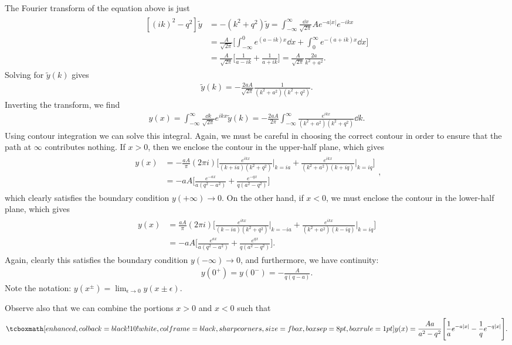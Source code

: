 The Fourier transform of the equation above is just
\begin{eqnarray}
\begin{aligned}
    [ (ik)^2- q^2 ] \tilde{y} &= -(k^2+q^2)\tilde{y} = \int_{-\infty}^{\infty} \frac{\dd{x}}{\sqrt{2\pi}} A e^{-a|x|}e^{-ikx} \\
    &= \frac{A}{\sqrt{2\pi}} \Bigg[ \int_{-\infty}^{0} e^{(a-ik)x} \dd{x} + \int_{0}^{\infty} e^{-(a+ik)x} \dd{x} \Bigg] \\
    &= \frac{A}{\sqrt{2\pi}} \Bigg[ \frac{1}{a-ik} + \frac{1}{a+ik} \Bigg] = \frac{A}{\sqrt{2\pi}} \frac{2a}{k^2+a^2}
.\end{aligned}
\end{eqnarray}
Solving for $\tilde{y}(k)$ gives
\begin{eqnarray}
    \tilde{y}(k) = -\frac{2aA}{\sqrt{2\pi}} \frac{1}{(k^2+a^2)(k^2+q^2)}
.\end{eqnarray}
Inverting the transform, we find
\begin{eqnarray}
    y(x) = \int_{-\infty}^{\infty} \frac{\dd{k}}{\sqrt{2\pi}} e^{ikx} \tilde{y}(k) = -\frac{2aA}{2\pi} \int_{-\infty}^{\infty} \frac{e^{ikx}}{(k^2+a^2)(k^2+q^2)} \dd{k}
.\end{eqnarray}
Using contour integration we can solve this integral.
Again, we must be careful in choosing the correct contour in order to ensure that the path at $\infty$ contributes nothing.
If $x > 0$, then we enclose the contour in the upper-half plane, which gives
\begin{eqnarray}
\begin{aligned}        
    y(x) &= -\frac{aA}{\pi} (2 \pi i) \Bigg[ \frac{e^{ikx}}{(k+ia)(k^2+q^2)}\Big|_{k=ia} + \frac{e^{ikx}}{(k^2+a^2)(k+iq)}\Big|_{k=iq} \Bigg] \\
    &= -aA \Bigg[ \frac{e^{-ax}}{a(q^2 - a^2)} + \frac{e^{-qx}}{q(a^2-q^2)} \Bigg]
\end{aligned}
,\end{eqnarray}
which clearly satisfies the boundary condition $y(+\infty) \rightarrow 0$.
On the other hand, if $x < 0$, we must enclose the contour in the lower-half plane, which gives
\begin{eqnarray}
\begin{aligned}
    y(x) &= \frac{aA}{\pi} (2 \pi i) \Bigg[ \frac{e^{ikx}}{(k-ia)(k^2+q^2)}\Big|_{k=-ia} + \frac{e^{ikx}}{(k^2+a^2)(k-iq)}\Big|_{k=iq} \Bigg] \\
    &= -aA \Bigg[ \frac{e^{ax}}{a(q^2 - a^2)} + \frac{e^{qx}}{q(a^2 - q^2)} \Bigg]
.\end{aligned}
\end{eqnarray}
Again, clearly this satisfies the boundary condition $y(-\infty) \rightarrow 0$, and furthermore, we have continuity:
\begin{eqnarray}
    y(0^{+}) = y(0^{-}) = -\frac{A}{q(q-a)}
.\end{eqnarray}
Note the notation: $y(x^{\pm}) = \lim_{\epsilon \rightarrow 0} y(x \pm \epsilon)$.

Observe also that we can combine the portions $x > 0$ and $x < 0$ such that
\begin{eqnarray}
    \eqbox{ y(x) = \frac{Aa}{a^2 - q^2} \Bigg[ \frac{1}{a}e^{-a|x|} - \frac{1}{q} e^{-q|x|} \Bigg] }
.\end{eqnarray}



